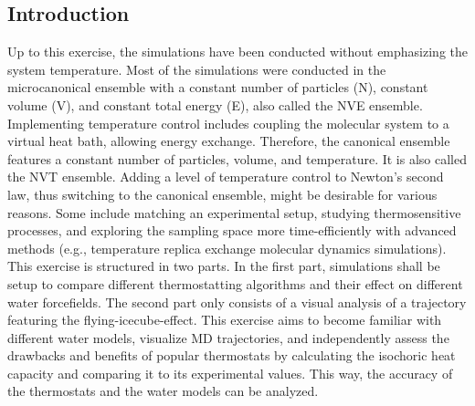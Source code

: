 \documentclass[9pt,tutorial]{livecoms}
\begin{document}
\subsection*{Introduction}
Up to this exercise, the simulations have been conducted without emphasizing the system temperature. Most of the simulations were conducted in the microcanonical ensemble with a constant number of particles (N), constant volume (V), and constant total energy (E), also called the NVE ensemble. Implementing temperature control includes coupling the molecular system to a virtual heat bath, allowing energy exchange. Therefore, the canonical ensemble features a constant number of particles, volume, and temperature. It is also called the NVT ensemble.\cite{Hnenberger2005} Adding a level of temperature control to Newton's second law, thus switching to the canonical ensemble, might be desirable for various reasons. Some include matching an experimental setup, studying thermosensitive processes, and exploring the sampling space more time-efficiently with advanced methods (e.g., temperature replica exchange molecular dynamics simulations\cite{Swendsen1986,Sugita1999}).\\
This exercise is structured in two parts. In the first part, simulations shall be setup to compare different thermostatting algorithms and their effect on different water forcefields. The second part only consists of a visual analysis of a trajectory featuring the flying-icecube-effect. This exercise aims to become familiar with different water models, visualize MD trajectories, and independently assess the drawbacks and benefits of popular thermostats by calculating the isochoric heat capacity and comparing it to its experimental values. This way, the accuracy of the thermostats and the water models can be analyzed. 
\end{document}

